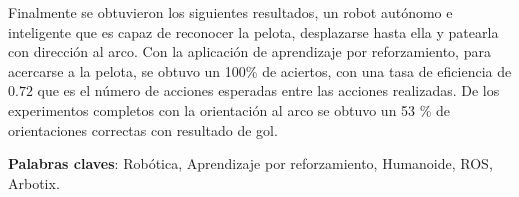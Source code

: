 Finalmente se obtuvieron los siguientes resultados, un robot aut\'onomo e inteligente que es capaz de reconocer la pelota, desplazarse hasta ella y patearla con direcci\'on al arco. Con la aplicaci\'on de aprendizaje por reforzamiento, para acercarse a la pelota, se obtuvo un 100\% de aciertos, con una tasa de eficiencia de $0.72$ que es el n\'umero de acciones esperadas entre las acciones realizadas. De los experimentos completos con la orientaci\'on al arco se obtuvo un 53 \% de orientaciones correctas con resultado de gol.
 
\textbf{Palabras claves}: Rob\'otica, Aprendizaje por reforzamiento, Humanoide, ROS, Arbotix.


